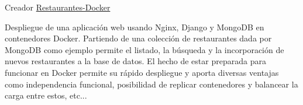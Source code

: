 \begin{cventries}
\cventry
{Creador} %
{\href{https://github.com/AythaE/CC-servicios_y_aplicaciones/tree/master/Practica2_PaaS}{Restaurantes-Docker}} %
{} %
{} %
{ %
	\begin{cvitems}
		\item {Despliegue de una aplicación web usando Nginx, Django y MongoDB en contenedores Docker. Partiendo de una colección de restaurantes dada por MongoDB como ejemplo permite el listado, la búsqueda y la incorporación de nuevos restaurantes a la base de datos. El hecho de estar preparada para funcionar en Docker permite su rápido despliegue y aporta diversas ventajas como independencia funcional, posibilidad de replicar contenedores y balancear la carga entre estos, etc...}
	\end{cvitems}
}


\end{cventries}
